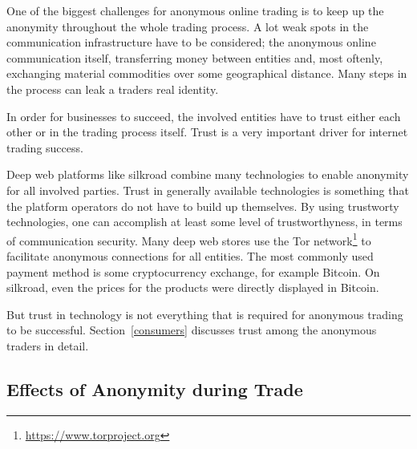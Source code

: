 One of the biggest challenges for anonymous online trading is to keep up the anonymity throughout the whole trading process. A lot weak spots in the communication infrastructure have to be considered; the anonymous online communication itself, transferring money between entities and, most oftenly, exchanging material commodities over some geographical distance. Many steps in the process can leak a traders real identity.

In order for businesses to succeed, the involved entities have to trust either each other or in the trading process itself. Trust is a very important driver for internet trading success\cite{internetTrust2004}.

Deep web platforms like silkroad\cite{silkroad2013} combine many technologies to enable anonymity for all involved parties. Trust in generally available technologies is something that the platform operators do not have to build up themselves. By using trustworty technologies, one can accomplish at least some level of trustworthyness, in terms of communication security. Many deep web stores use the Tor network\footnote{\url{https://www.torproject.org}} to facilitate anonymous connections for all entities\cite{silkroad2013}. The most commonly used payment method is some cryptocurrency exchange, for example Bitcoin. On silkroad, even the prices for the products were directly displayed in Bitcoin\cite{silkroad2013}. 

But trust in technology is not everything that is required for anonymous trading to be successful. Section~\ref{consumers} discusses trust among the anonymous traders in detail.

\subsection{Effects of Anonymity during Trade}




